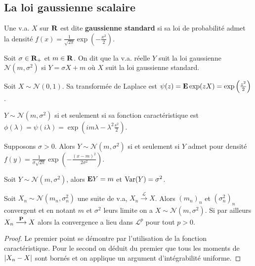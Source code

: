 \subsection{La loi gaussienne scalaire}

	\begin{defn}
		Une v.a. $X$ sur $\mathbf{R}$ est dite \textbf{gaussienne standard} si sa loi de probabilité admet la densité $f(x) = \frac{1}{\sqrt{2 \pi}} \exp \left( - \frac{x^2}{2} \right)$.
	\end{defn}
	
	\begin{defn}
		Soit $\sigma \in \mathbf{R}_+$ et $m \in \mathbf{R}$.
		On dit que la v.a. réelle $Y$ suit la loi gaussienne $\mathcal{N}(m,\sigma^2)$ si $Y = \sigma X + m$ où $X$ suit la loi gaussienne standard.
	\end{defn}
	
	\begin{pop}
		Soit $X \sim \mathcal{N}(0,1)$.
		Sa transformée de Laplace est $\psi(z) = \mathbf{E} \exp(zX) = \exp \left( \frac{z^2}{2} \right)$.
	\end{pop}
	
	\begin{pop}
		$Y \sim \mathcal{N}(m,\sigma^2)$ si et seulement si sa fonction caractéristique est $\phi(\lambda) = \psi(i \lambda) = \exp \left( im \lambda - \lambda^2 \frac{s^2}{2} \right)$.
	\end{pop}
	
	\begin{pop}
		Supposons $\sigma > 0$.
		Alors $Y \sim \mathcal{N}(m,\sigma^2)$ si et seulement si $Y$ admet pour densité $f(y) = \frac{1}{\sigma \sqrt{2 \pi}} \exp \left( - \frac{(x - m)^2}{2 \sigma^2} \right)$.
	\end{pop}
	
	\begin{pop}
		Soit $Y \sim \mathcal{N}(m,\sigma^2)$, alors $\mathbf{E} Y = m$ et $\operatorname{Var}(Y) = \sigma^2$.
	\end{pop}
	
	\begin{pop}
		Soit $X_n \sim \mathcal{N}(m_n, \sigma_n^2)$ une suite de v.a, $X_n \overset{\mathcal{L}}{\longrightarrow} X$.
		Alors $(m_n)_n$ et $(\sigma_n^2)_n$ convergent et en notant $m$ et $\sigma^2$ leurs limite on a $X \sim \mathcal{N}(m,\sigma^2)$.
		Si par ailleurs $X_n \overset{\mathbf{P}}{\longrightarrow} X$ alors la convergence a lieu dans $\mathcal{L}^p$ pour tout $p > 0$.
	\end{pop}
	
	\begin{proof}
		Le premier point se démontre par l'utilisation de la fonction caractéristique.
		Pour le second on déduit du premier que tous les moments de $\left\lvert X_n - X\right\rvert$ sont bornés et on applique un argument d'intégrabilité uniforme.
	\end{proof}



